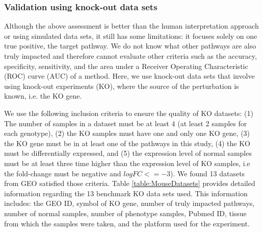 \documentclass[Minh_PhD_thesis.tex]{subfiles}
\begin{document}

\subsubsection{Validation using knock-out data sets}
\label{KOsubsubsection}

Although the above assessment is better than the human interpretation approach or using simulated data sets, it still has some limitations: it focuses solely on one true positive, the target pathway. We do not know what other pathways are also truly impacted and therefore cannot evaluate other criteria such as the accuracy, specificity, sensitivity, and the area under a Receiver Operating Characteristic (ROC) curve (AUC) of a method. Here, we use knock-out data sets that involve using knock-out experiments (KO), where the source of the perturbation is known, i.e. the KO gene.

We use the following inclusion criteria to ensure the quality of KO datasets: (1) The number of samples in a dataset must be at least 4 (at least 2 samples for each genotype), (2) the KO samples must have one and only one KO gene, (3) the KO gene must be in at least one of the pathways in this study, (4) the KO must be differentially expressed, and (5) the expression level of normal samples must be at least three time higher than the expression level of KO samples, i.e the fold-change must be negative and $logFC <= -3$).
We found 13 datasets from GEO satisfied those criteria. Table \ref{table:MouseDatasets} provides detailed information regarding the 13 benchmark KO data sets used. This information includes:  the GEO ID, symbol of KO gene, number of truly impacted pathways, number of normal samples, number of phenotype samples, Pubmed ID, tissue from which the samples were taken, and the platform used for the experiment.
\end{document}

